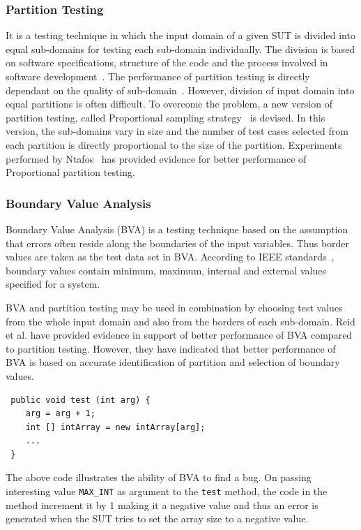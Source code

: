 \subsubsection{Partition Testing}
It is a testing technique in which the input domain of a given SUT is divided into equal sub-domains for testing each sub-domain individually. The division is based on software specifications, structure of the code and the process involved in software development~\cite{hamlet1990partition}. The performance of partition testing is directly dependant on the quality of sub-domain~\cite{weyuker1991analyzing}. However, division of input domain into equal partitions is often difficult. To overcome the problem, a new version of partition testing, called Proportional sampling strategy~\cite{chan1996proportional} is devised. In this version, the sub-domains vary in size and the number of test cases selected from each partition is directly proportional to the size of the partition. Experiments performed by Ntafos~\cite{ntafos1998random} has provided evidence for better performance of Proportional partition testing.


\subsubsection{Boundary Value Analysis}
Boundary Value Analysis (BVA) is a testing technique based on the assumption that errors often reside along the boundaries of the input variables. Thus border values are taken as the test data set in BVA. According to IEEE standards~\cite{radatz1990ieee}, boundary values contain minimum, maximum, internal and external values specified for a system. 

BVA and partition testing may be used in combination by choosing test values from the whole input domain and also from the borders of each sub-domain. Reid et al. \cite{reid1997empirical} have provided evidence in support of better performance of BVA compared to partition testing. However, they have indicated that better performance of BVA is based on accurate identification of partition and selection of boundary values.

\begin{lstlisting}
 public void test (int arg) {
	arg = arg + 1;
	int [] intArray = new intArray[arg];
	...
 }
\end{lstlisting}

The above code illustrates the ability of BVA to find a bug.  On passing interesting value \verb+MAX_INT+ as argument to the \verb+test+ method, the code in the method increment it by 1 making it a negative value and thus an error is generated when the SUT tries to set the array size to a negative value.

